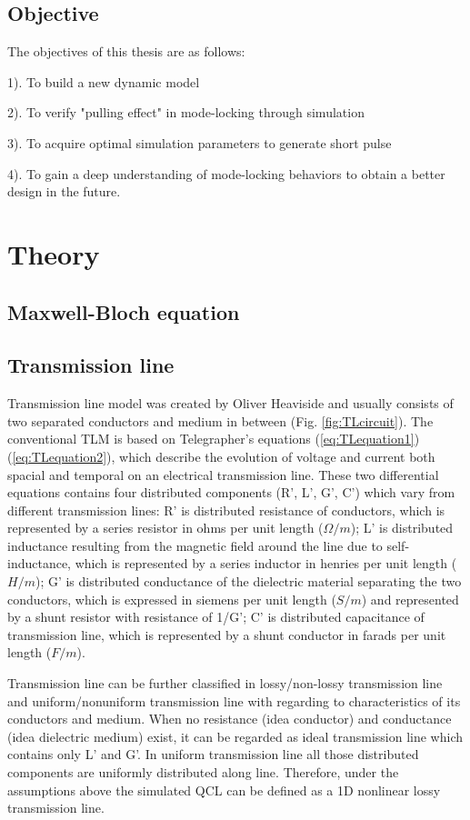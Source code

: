\documentclass[11pt,final]{scrbook}
\begin{document}
\section{Objective}
The objectives of this thesis are as follows:

1). To build a new dynamic model 

2). To verify "pulling effect" in mode-locking through simulation

3). To acquire optimal simulation parameters to generate short pulse

4). To gain a deep understanding of mode-locking behaviors to obtain a better design in the future.

\chapter{Theory}
\section{Maxwell-Bloch equation}
\section{Transmission line}
Transmission line model was created by Oliver Heaviside \cite{heaviside2008electromagnetic} and usually consists of two separated conductors and medium in between (Fig. \ref{fig:TLcircuit}). The conventional TLM is based on Telegrapher's equations (\ref{eq:TLequation1})(\ref{eq:TLequation2}), which describe the evolution of voltage and current both spacial and temporal on an electrical transmission line. These two differential equations contains four distributed components (R', L', G', C') which vary from different transmission lines: R' is distributed resistance of conductors, which is represented by a series resistor in ohms per unit length ($\Omega /m$); L' is distributed inductance resulting from the magnetic field around the line due to self-inductance, which is represented by a series inductor in henries per unit length ($H/m$); G' is distributed conductance of the dielectric material separating the two conductors, which is expressed in siemens per unit length ($S/m$) and represented by a shunt resistor with resistance of 1/G'; C' is distributed capacitance of transmission line, which is represented by a shunt conductor in farads per unit length ($F/m$).

Transmission line can be further classified in lossy/non-lossy transmission line and uniform/nonuniform transmission line with regarding to characteristics of its conductors and medium. When no resistance (idea conductor) and conductance (idea dielectric medium) exist, it can be regarded as ideal transmission line which contains only L' and G'. In uniform transmission line all those distributed components are uniformly distributed along line. Therefore, under the assumptions above the simulated QCL can be defined as a 1D nonlinear lossy transmission line.\\
\end{document}

